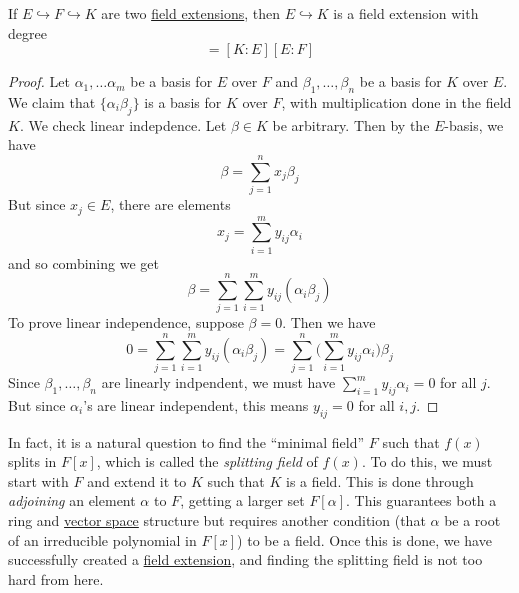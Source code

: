   \begin{theorem}
    \label{thm:tower-rule}
    If $E \hookrightarrow F \hookrightarrow K$ are two \hyperref[def:field-extension]{field extensions}, then $E \hookrightarrow K$ is a field extension with degree 
    \begin{equation}
      [K:E] = [K:E] [E:F]
    \end{equation}
  \end{theorem}
  \begin{proof}
    Let $\alpha_1, \ldots \alpha_m$ be a basis for $E$ over $F$ and $\beta_1, \ldots, \beta_n$ be a basis for $K$ over $E$. We claim that $\{\alpha_i \beta_j\}$ is a basis for $K$ over $F$, with multiplication done in the field $K$. We check linear indepdence. Let $\beta \in K$ be arbitrary. Then by the $E$-basis, we have 
    \begin{equation}
      \beta = \sum_{j=1}^n x_j \beta_j
    \end{equation} 
    But since $x_j \in E$, there are elements 
    \begin{equation}
      x_j = \sum_{i=1}^m y_{ij} \alpha_i
    \end{equation}
    and so combining we get 
    \begin{equation}
      \beta = \sum_{j=1}^n \sum_{i=1}^m y_{ij} (\alpha_i \beta_j) 
    \end{equation}
    To prove linear independence, suppose $\beta = 0$. Then we have 
    \begin{equation}
      0 = \sum_{j=1}^n \sum_{i=1}^m y_{ij} (\alpha_i \beta_j) = \sum_{j=1}^n \bigg( \sum_{i=1}^m y_{ij} \alpha_i \bigg) \beta_j 
    \end{equation}
    Since $\beta_1, \ldots, \beta_n$ are linearly indpendent, we must have $\sum_{i=1}^m y_{ij} \alpha_i = 0$ for all $j$. But since $\alpha_i$'s are linear independent, this means $y_{ij} = 0$ for all $i, j$. 
  \end{proof} 

  In fact, it is a natural question to find the ``minimal field'' $F$ such that $f(x)$ splits in $F[x]$, which is called the \textit{splitting field} of $f(x)$. To do this, we must start with $F$ and extend it to $K$ such that $K$ is a field. This is done through \textit{adjoining} an element $\alpha$ to $F$, getting a larger set $F[\alpha]$. This guarantees both a ring and \hyperref[def:vector-space]{vector space} structure but requires another condition (that $\alpha$ be a root of an irreducible polynomial in $F[x]$) to be a field. Once this is done, we have successfully created a \hyperref[def:field-extension]{field extension}, and finding the splitting field is not too hard from here. 

